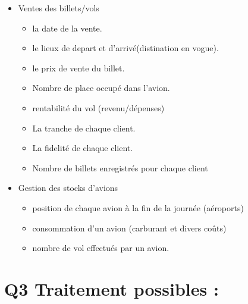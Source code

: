 \documentclass[oneside,13pt,a4paper]{article}
\begin{document}
\begin{itemize}
  \item Ventes des billets/vols
        \begin{itemize}
          \item la date de la vente.
          \item le lieux de depart et d'arrivé(distination en vogue).
          \item le prix de vente du billet.
          \item Nombre de place occupé dans l'avion.
          \item rentabilité du vol (revenu/dépenses)
          \item La tranche de chaque client. 
          \item La fidelité de chaque client.
          \item Nombre de billets enregistrés pour chaque client 
        \end{itemize}
\end{itemize}
\begin{itemize}
  \item Gestion des stocks d'avions
        \begin{itemize}
          \item position de chaque avion à la fin de la journée (aéroports)
          \item consommation d'un avion (carburant et divers coûts)
          \item nombre de vol effectués par un avion.
        \end{itemize}
\end{itemize}

\section{Q3 Traitement possibles : }
\end{document}
